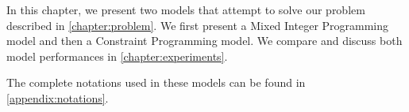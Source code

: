 \documentclass[../../thesis.tex]{subfiles}
\begin{document}
In this chapter, we present two models that attempt to solve our problem described in \autoref{chapter:problem}.
We first present 
a Mixed Integer Programming model and then a Constraint Programming model.
We compare and discuss both model performances in \autoref{chapter:experiments}.

The complete notations used in these models can be found in \autoref{appendix:notations}.
\end{document}
